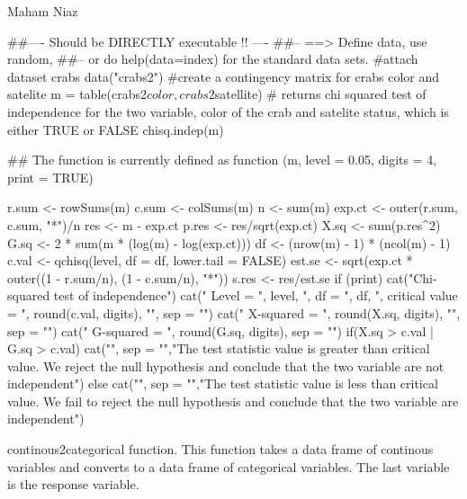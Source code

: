 \documentclass[letterpaper]{book}
\begin{document}
%
\begin{Author}\relax
Maham Niaz
\end{Author}
%
\begin{Examples}
\begin{ExampleCode}
##---- Should be DIRECTLY executable !! ----
##-- ==>  Define data, use random,
##--	or do  help(data=index)  for the standard data sets.
#attach dataset crabs
  data("crabs2")
  #create a contingency matrix for crabs color and satelite 
  m = table(crabs2$color, crabs2$satellite)
  # returns chi squared test of independence for the two variable, color of the crab and satelite status, which is either TRUE or FALSE 
  chisq.indep(m)
  
  
  
## The function is currently defined as
function (m, level = 0.05, digits = 4, print = TRUE) 
{
    r.sum <- rowSums(m)
    c.sum <- colSums(m)
    n <- sum(m)
    exp.ct <- outer(r.sum, c.sum, "*")/n
    res <- m - exp.ct
    p.res <- res/sqrt(exp.ct)
    X.sq <- sum(p.res^2)
    G.sq <- 2 * sum(m * (log(m) - log(exp.ct)))
    df <- (nrow(m) - 1) * (ncol(m) - 1)
    c.val <- qchisq(level, df = df, lower.tail = FALSE)
    est.se <- sqrt(exp.ct * outer((1 - r.sum/n), (1 - c.sum/n), 
        "*"))
    s.res <- res/est.se
    if (print) {
        cat("Chi-squared test of independence\n")
        cat("  Level = ", level, ", df = ", df, ", critical value = ", 
            round(c.val, digits), "\n", sep = "")
        cat("  X-squared = ", round(X.sq, digits), "\n", sep = "")
        cat("  G-squared = ", round(G.sq, digits), sep = "")
      if(X.sq > c.val | G.sq > c.val){
      cat("\n", sep = "","The test statistic value is greater than critical value. We reject the null hypothesis and conclude that the two variable are not independent")
    } else {
      cat("\n", sep = "","The test statistic value is less than critical value. We fail to reject the null hypothesis and conclude that the two variable are independent")
    }
    }
    
  }
\end{ExampleCode}
\end{Examples}
%
\begin{Description}\relax

continous2categorical function. This function takes a data frame of continous variables and converts to a data frame of categorical variables. The last variable is the response variable.

\end{Description}
\end{document}
